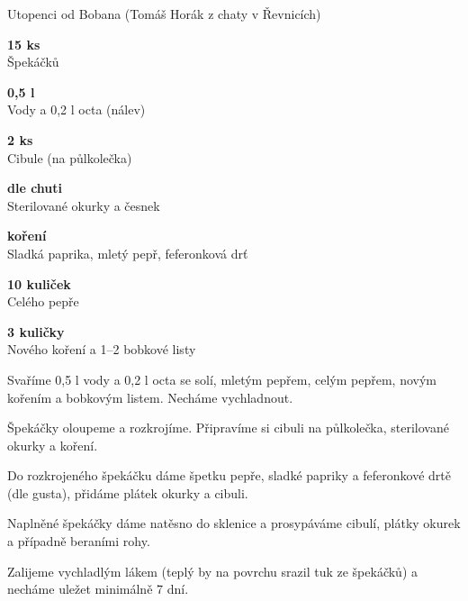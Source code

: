 \documentclass[11pt,a4paper]{article}
\begin{document}
\begin{recipe}[IndianRed]{Utopenci od Bobana (Tomáš Horák z chaty v Řevnicích)}
    \begin{ingredients}
        \item \parbox[t]{\linewidth}{\raggedright \piece \textbf{15 ks}\\ Špekáčků}
        \item \parbox[t]{\linewidth}{\raggedright \liquid \textbf{0,5 l}\\ Vody a 0,2 l octa (nálev)}
        \item \parbox[t]{\linewidth}{\raggedright \piece \textbf{2 ks}\\ Cibule (na půlkolečka)}
        \item \parbox[t]{\linewidth}{\raggedright \piece \textbf{dle chuti}\\ Sterilované okurky a česnek}
        \item \parbox[t]{\linewidth}{\raggedright \indefinite \textbf{koření}\\ Sladká paprika, mletý pepř, feferonková drť}
        \item \parbox[t]{\linewidth}{\raggedright \piece \textbf{10 kuliček}\\ Celého pepře}
        \item \parbox[t]{\linewidth}{\raggedright \piece \textbf{3 kuličky}\\ Nového koření a 1–2 bobkové listy}
    \end{ingredients}
    \begin{steps}
        \item Svaříme 0,5 l vody a 0,2 l octa se solí, mletým pepřem, celým pepřem, novým kořením a bobkovým listem. Necháme vychladnout.
        \item Špekáčky oloupeme a rozkrojíme. Připravíme si cibuli na půlkolečka, sterilované okurky a koření.
        \item Do rozkrojeného špekáčku dáme špetku pepře, sladké papriky a feferonkové drtě (dle gusta), přidáme plátek okurky a cibuli.
        \item Naplněné špekáčky dáme natěsno do sklenice a prosypáváme cibulí, plátky okurek a případně beraními rohy.
        \item Zalijeme vychladlým lákem (teplý by na povrchu srazil tuk ze špekáčků) a necháme uležet minimálně 7 dní.
    \end{steps}
\end{recipe}
\end{document}
